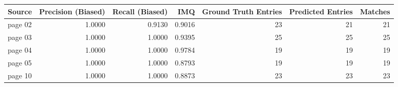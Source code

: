 \begin{tabular}{lrrrrrr}
\toprule
Source & Precision (Biased) & Recall (Biased) & IMQ & Ground Truth Entries & Predicted Entries & Matches \\
\midrule
page 02 & 1.0000 & 0.9130 & 0.9016 & 23 & 21 & 21 \\
page 03 & 1.0000 & 1.0000 & 0.9395 & 25 & 25 & 25 \\
page 04 & 1.0000 & 1.0000 & 0.9784 & 19 & 19 & 19 \\
page 05 & 1.0000 & 1.0000 & 0.8793 & 19 & 19 & 19 \\
page 10 & 1.0000 & 1.0000 & 0.8873 & 23 & 23 & 23 \\
\bottomrule
\end{tabular}
